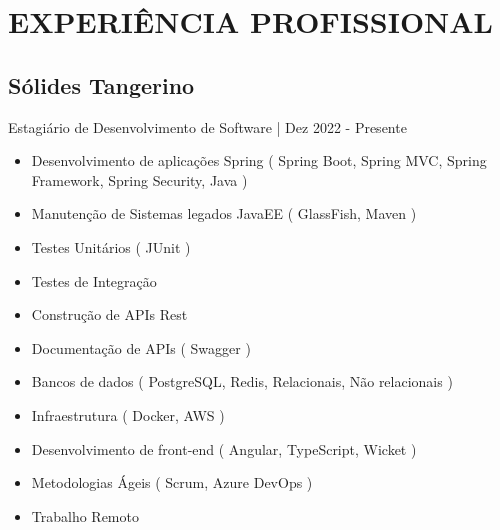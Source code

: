 

\section{EXPERIÊNCIA PROFISSIONAL}

\subsection{Sólides Tangerino}

Estagiário de Desenvolvimento de Software | Dez 2022 - Presente
\begin{itemize}[leftmargin=*]
  \item Desenvolvimento de aplicações Spring ( Spring Boot, Spring MVC, Spring Framework, Spring Security, Java )
  \item Manutenção de Sistemas legados JavaEE ( GlassFish, Maven )
  \item Testes Unitários ( JUnit )
  \item Testes de Integração
  \item Construção de APIs Rest
  \item Documentação de APIs ( Swagger )
  \item Bancos de dados ( PostgreSQL, Redis, Relacionais, Não relacionais )
  \item Infraestrutura ( Docker, AWS )
  \item Desenvolvimento de front-end ( Angular, TypeScript, Wicket )
  \item Metodologias Ágeis ( Scrum, Azure DevOps )
  \item Trabalho Remoto
\end{itemize}

